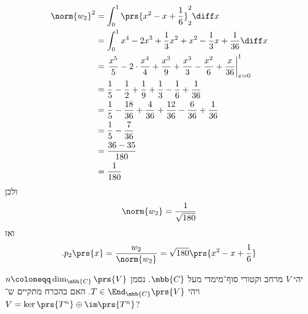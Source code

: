 \documentclass[a4paper,10pt,twoside,openany]{article}
\begin{document}
\begin{solution}
\begin{align*}
\norm{w_2}^2 &=
\int_0^1 \prs{x^2 -x + \frac{1}{6}}_2^2 \diff x
\\&=
\int_0^1 x^4 - 2 x^3 + \frac{1}{3} x^2 + x^2 - \frac{1}{3} x + \frac{1}{36} \diff x
\\&=
\left. \frac{x^5}{5} - 2 \cdot \frac{x^4}{4} + \frac{x^3}{9} + \frac{x^3}{3} - \frac{x^2}{6} + \frac{x}{36} \right|_{x=0}^1
\\&=
\frac{1}{5} - \frac{1}{2} + \frac{1}{9} + \frac{1}{3} - \frac{1}{6} + \frac{1}{36}
\\&=
\frac{1}{5} - \frac{18}{36} + \frac{4}{36} + \frac{12}{36} - \frac{6}{36} + \frac{1}{36}
\\&=
\frac{1}{5} - \frac{7}{36}
\\&=
\frac{36 - 35}{180}
\\&=
\frac{1}{180}
\end{align*}
ולכן
\begin{align*}
\norm{w_2} = \frac{1}{\sqrt{180}}
\end{align*}
ואז
\begin{align*}
\text{.} p_2\prs{x} = \frac{w_2}{\norm{w_2}} = \sqrt{180} \prs{x^2 - x + \frac{1}{6}}
\end{align*}

\end{solution}

\setcounter{question}{7}

\newpage

\begin{question}
יהי
$V$
מרחב וקטורי סוף־מימדי מעל
$\mbb{C}$.
נסמן
$n \coloneqq \dim_{\mbb{C}}\prs{V}$
ויהי
$T \in \End_{\mbb{C}}\prs{V}$.
האם בהכרח מתקיים ש־%
$V = \ker\prs{T^n} \oplus \im\prs{T^n}$?
\end{question}
\end{document}
